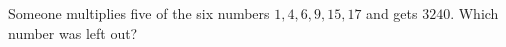 Someone multiplies five of the six numbers $1,4,6,9,15,17$ and gets $3240$. Which number was left out?
